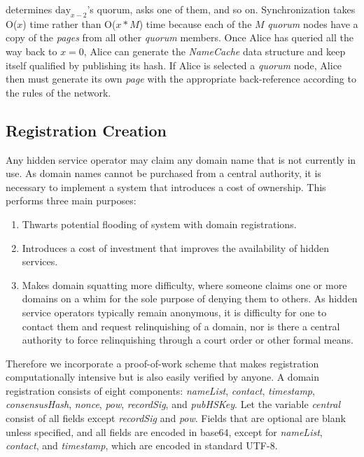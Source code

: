  determines $ \textrm{day}_{x-2} $'s quorum, asks one of them, and so on. Synchronization takes O($ x $) time rather than O($ x * M $) time because each of the $ M $ \emph{quorum} nodes have a copy of the \emph{pages} from all other \emph{quorum} members. Once Alice has queried all the way back to $ x = 0 $, Alice can generate the \emph{NameCache} data structure and keep itself qualified by publishing its hash. If Alice is selected a \emph{quorum} node, Alice then must generate its own \emph{page} with the appropriate back-reference according to the rules of the network.





\subsection{Registration Creation}

Any hidden service operator may claim any domain name that is not currently in use. As domain names cannot be purchased from a central authority, it is necessary to implement a system that introduces a cost of ownership. This performs three main purposes: 

\begin{enumerate}
	\item Thwarts potential flooding of system with domain registrations.
	\item Introduces a cost of investment that improves the availability of hidden services.
	\item Makes domain squatting more difficulty, where someone claims one or more domains on a whim for the sole purpose of denying them to others. As hidden service operators typically remain anonymous, it is difficulty for one to contact them and request relinquishing of a domain, nor is there a central authority to force relinquishing through a court order or other formal means.
\end{enumerate}

Therefore we incorporate a proof-of-work scheme that makes registration computationally intensive but is also easily verified by anyone. A domain registration consists of eight components: \emph{nameList}, \emph{contact}, \emph{timestamp}, \emph{consensusHash}, \emph{nonce}, \emph{pow}, \emph{recordSig}, and \emph{pubHSKey}. Let the variable \emph{central} consist of all fields except \emph{recordSig} and \emph{pow}. Fields that are optional are blank unless specified, and all fields are encoded in base64, except for \emph{nameList}, \emph{contact}, and \emph{timestamp}, which are encoded in standard UTF-8.

